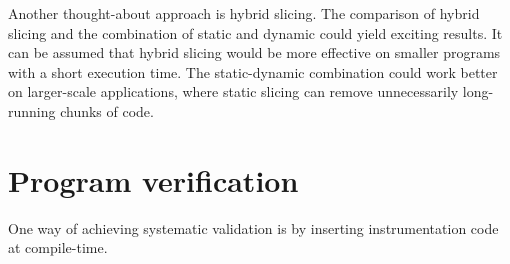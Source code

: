 
Another thought-about approach is hybrid slicing.
The comparison of hybrid slicing and the combination of static and dynamic 
could yield exciting results.
It can be assumed that hybrid slicing would be more effective on smaller 
programs with a short execution time.
The static-dynamic combination could work better on larger-scale 
applications, where static slicing can remove unnecessarily long-running 
chunks of code.


\section{Program verification}




One way of achieving systematic validation is by inserting 
instrumentation code at compile-time.

